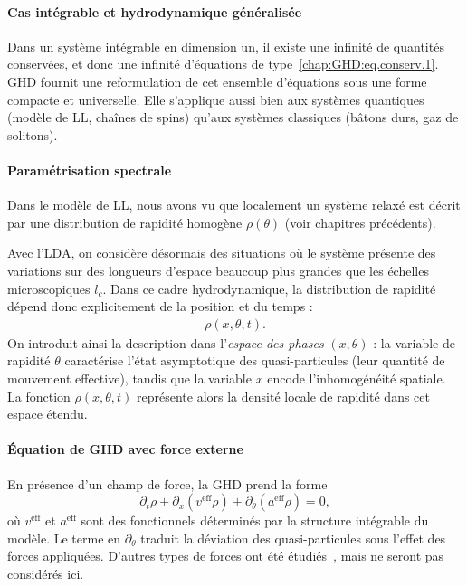\paragraph{Cas intégrable et hydrodynamique généralisée}  
Dans un système intégrable en dimension un, il existe une infinité de quantités conservées, et donc une infinité d’équations de type~\eqref{chap:GHD:eq.conserv.1}. \gls{GHD} fournit une reformulation de cet ensemble d’équations sous une forme compacte et universelle. Elle s’applique aussi bien aux systèmes quantiques (modèle de \gls{LL}, chaînes de spins) qu’aux systèmes classiques (bâtons durs, gaz de solitons).


\paragraph{Paramétrisation spectrale}  
Dans le modèle de \gls{LL}, nous avons vu que localement un système relaxé est décrit par une distribution de rapidité homogène $\rho(\theta)$ (voir chapitres précédents).  

Avec l’\gls{LDA}, on considère désormais des situations où le système présente des variations sur des longueurs d’espace beaucoup plus grandes que les échelles microscopiques $l_c$. Dans ce cadre hydrodynamique, la distribution de rapidité dépend donc explicitement de la position et du temps :  
\begin{eqnarray*}
\rho(x,\theta,t).
\end{eqnarray*}
On introduit ainsi la description dans l’\emph{espace des phases} $(x,\theta)$ :  
la variable de rapidité $\theta$ caractérise l’état asymptotique des quasi-particules (leur quantité de mouvement effective),  
tandis que la variable $x$ encode l’inhomogénéité spatiale.  
La fonction $\rho(x,\theta,t)$ représente alors la densité locale de rapidité dans cet espace étendu.



\paragraph{Équation de GHD avec force externe}  
En présence d’un champ de force, la GHD prend la forme~\cite{ref11}
\begin{equation}\label{chap:GHD:eq.GHD.1}
	\partial_t \rho + \partial_x \!\left(v^{\text{eff}} \rho\right) 
	+ \partial_\theta \!\left(a^{\text{eff}} \rho\right) = 0,
\end{equation}
où $v^{\text{eff}}$ et $a^{\text{eff}}$ sont des fonctionnels déterminés par la structure intégrable du modèle. Le terme en $\partial_\theta$ traduit la déviation des quasi-particules sous l’effet des forces appliquées. D’autres types de forces ont été étudiés~\cite{Bastianello2019a,Bastianello2019b}, mais ne seront pas considérés ici. 

